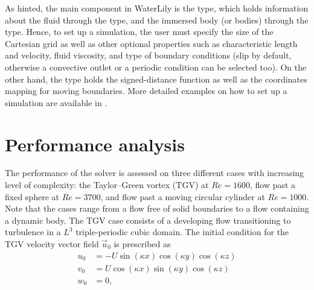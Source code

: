 \documentclass[10pt,a4paper]{article}
\begin{document}
As hinted, the main component in WaterLily is the  type, which holds information about the fluid through the  type, and the immersed body (or bodies) through the  type. Hence, to set up a simulation, the user must specify the size of the Cartesian grid as well as other optional properties such as characteristic length and velocity, fluid viscosity, and type of boundary conditions (slip by default, otherwise a convective outlet or a periodic condition can be selected too). On the other hand, the  type holds the signed-distance function as well as the coordinates mapping for moving boundaries. More detailed examples on how to set up a simulation are available in .

\section{Performance analysis} \label{sec:performance}
The performance of the solver is assessed on three different cases with increasing level of complexity: the Taylor--Green vortex (TGV) at $Re=1600$, flow past a fixed sphere at $Re=3700$, and flow past a moving circular cylinder at $Re=1000$. Note that the cases range from a flow free of solid boundaries to a flow containing a dynamic body. The TGV case consists of a developing flow transitioning to turbulence in a $L^3$ triple-periodic cubic domain. The initial condition for the TGV velocity vector field $\vec{u}_0$ is prescribed as
\begin{align}
u_0 &= -U\sin(\kappa x)\cos(\kappa y)\cos(\kappa z) \\
v_0 &= U\cos(\kappa x)\sin(\kappa y)\cos(\kappa z) \\
w_0 &= 0,
\end{align}
\end{document}
